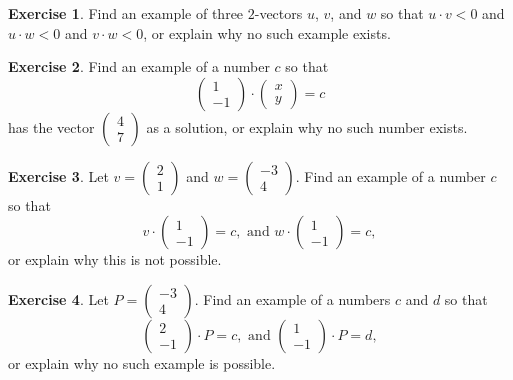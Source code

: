 \documentclass[11pt]{amsart}
\theoremstyle{definition}
\newtheorem{exercise}{Exercise}
\begin{document}
\begin{exercise}
Find an example of three $2$-vectors $u$, $v$, and $w$ so that $u\cdot v < 0$ and $u \cdot w < 0$ and $v \cdot w < 0$, or explain why no such example exists.
\end{exercise}

\begin{exercise}
Find an example of a number $c$ so that
\begin{equation*}
\begin{pmatrix} 1 \\ -1 \end{pmatrix} \cdot \begin{pmatrix} x \\ y \end{pmatrix} = c
\end{equation*}
has the vector $\left( \begin{smallmatrix} 4 \\ 7 \end{smallmatrix} \right)$ as a solution, or explain why no such number exists.
\end{exercise}

\begin{exercise}
Let $v = \left(\begin{smallmatrix} 2 \\ 1 \end{smallmatrix}\right)$ and $w = \left(\begin{smallmatrix} -3 \\ 4 \end{smallmatrix} \right)$. Find an example of a number $c$ so that
\begin{equation*}
v \cdot \begin{pmatrix} 1 \\ -1 \end{pmatrix} = c, \text{ and } w \cdot \begin{pmatrix} 1 \\ -1 \end{pmatrix} = c,
\end{equation*}
or explain why this is not possible.

\end{exercise}

\begin{exercise}
Let $P = \begin{pmatrix}-3 \\ 4 \end{pmatrix}$. Find an example of a numbers $c$ and $d$ so that
\begin{equation*}
\begin{pmatrix} 2 \\ -1 \end{pmatrix} \cdot P = c, \text{ and }
\begin{pmatrix} 1 \\ -1 \end{pmatrix} \cdot P = d,
\end{equation*}
or explain why no such example is possible.
\end{exercise}
\end{document}
